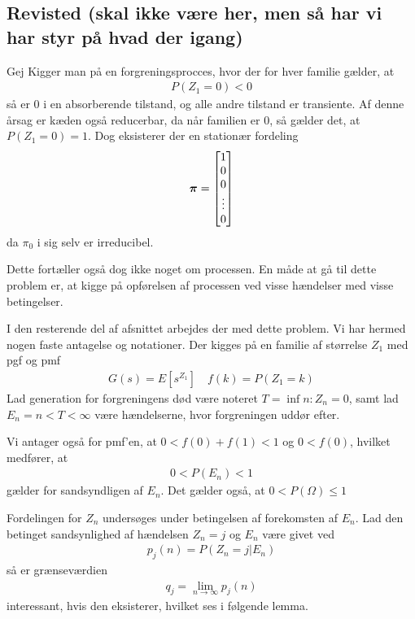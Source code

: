 \subsection{Revisted (skal ikke være her, men så har vi har styr på hvad der igang)}
Gej
Kigger man på en forgreningsprocces, hvor der for hver familie gælder, at   
\begin{align*}
P(Z_1=0)<0    
\end{align*}
så er $0$ i en absorberende tilstand, og alle andre tilstand er transiente. Af denne årsag er kæden også reducerbar, da når familien er $0$, så gælder det, at $P(Z_1=0)=1$. Dog eksisterer der en stationær fordeling 
\begin{align*}
    \boldsymbol{\pi}=\begin{bmatrix}
1\\
0\\
0\\
\vdots\\
0
\end{bmatrix}
\end{align*}
da $\pi_0$ i sig selv er irreducibel.  

Dette fortæller også dog ikke noget om processen. En måde at gå til dette problem er, at kigge på opførelsen af processen ved visse hændelser med visse betingelser. 

I den resterende del af afsnittet arbejdes der med dette problem. Vi har hermed nogen faste antagelse og notationer. Der kigges på en familie af størrelse $Z_1$ med pgf og pmf 
\begin{align*}
    G(s)=E[s^{Z_1}] \quad f(k)=P(Z_1=k)
\end{align*} 
Lad generation for forgreningens død være noteret $T=\inf{n:Z_n=0}$, samt  
lad $E_n={n<T<\infty}$
være hændelserne, hvor forgreningen uddør efter. 

Vi antager også for pmf'en, at $0<f(0)+f(1)<1$ og $0<f(0)$, hvilket medfører, at 
\begin{align*}
    0<P(E_n)<1    
\end{align*}
gælder for sandsyndligen af $E_n$. Det gælder også, at $0< P(\Omega)\leq 1$

Fordelingen for $Z_n$ undersøges under betingelsen af forekomsten af $E_n$. Lad den betinget sandsynlighed af hændelsen $Z_n=j$ og $E_n$ være givet ved 
\begin{align*}
    p_j(n)=P(Z_n=j | E_n)
\end{align*}
så er grænseværdien 
\begin{align*}
q_j=\lim_{n\to \infty} p_j(n)    
\end{align*}
interessant, hvis den eksisterer, hvilket ses i følgende lemma. 

